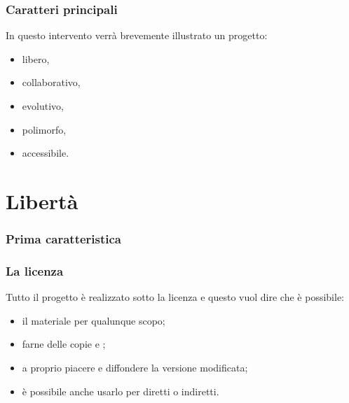 \documentclass{beamer} %
\begin{document}
\begin{frame}\frametitle{Caratteri principali}

In questo intervento verrà brevemente illustrato un progetto:

\bigskip
\begin{itemize}  %
\item libero,
\item collaborativo,
\item evolutivo,
\item polimorfo,
\item accessibile.
\end{itemize}

\end{frame}


\section{Libertà}


\begin{frame}\frametitle{Prima caratteristica}

\begin{center}  \end{center}

\vspace{20mm}

\end{frame}


\begin{frame}\frametitle{La licenza}

Tutto il progetto è realizzato sotto la licenza  
e questo vuol dire 
che è possibile:
\begin{itemize} [<+->]
\item {} il materiale per qualunque scopo;
\item farne delle copie e ;
\item {} a proprio piacere e 
diffondere la versione modificata;
\item è possibile anche usarlo per  
diretti o indiretti.
\end{itemize}

\end{frame}
\end{document}
